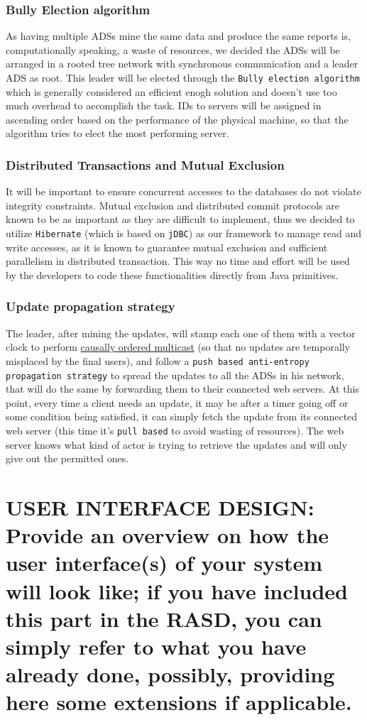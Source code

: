 \documentclass[12pt,a4paper]{article}
\begin{document}
\subsubsection{Bully Election algorithm}
As having multiple ADSs mine the same data and produce the same reports is, computationally speaking, a waste of resources, we decided the ADSs will be arranged in a rooted tree network with synchronous communication and a leader ADS as root. This leader will be elected through the \texttt{Bully election algorithm} which is generally considered an efficient enogh solution and doesn't use too much overhead to accomplish the task. IDs to servers will be assigned in ascending order based on the performance of the physical machine, so that the algorithm tries to elect the most performing server.
\subsubsection{Distributed Transactions and Mutual Exclusion}
It will be important to ensure concurrent accesses to the databases do not violate integrity constraints. Mutual exclusion and distributed commit protocols are known to be as important as they are difficult to implement, thus we decided to utilize \texttt{Hibernate} (which is based on \texttt{jDBC}) as our framework to manage read and write accesses, as it is known to guarantee mutual exclusion and sufficient parallelism in distributed transaction. This way no time and effort will be used by the developers to code these functionalities directly from Java primitives.
\subsubsection{Update propagation strategy}
The leader, after mining the updates, will stamp each one of them with a vector clock to perform \underline{causally ordered multicast} (so that no updates are temporally misplaced by the final users), and follow a \texttt{push based anti-entropy propagation strategy} to spread the updates to all the ADSs in his network, that will do the same by forwarding them to their connected web servers. At this point, every time a client needs an update, it may be after a timer going off or some condition being satisfied, it can simply fetch the update from its connected web server (this time it's \texttt{pull based} to avoid wasting of resources). The web server knows what kind of actor is trying to retrieve the updates and will only give out the permitted ones. 
\section{USER INTERFACE DESIGN: Provide an overview on how the user interface(s) of your system will look like; if you have included this part in the RASD, you can simply refer to what you have already done, possibly, providing here some extensions if applicable.}
\end{document}
